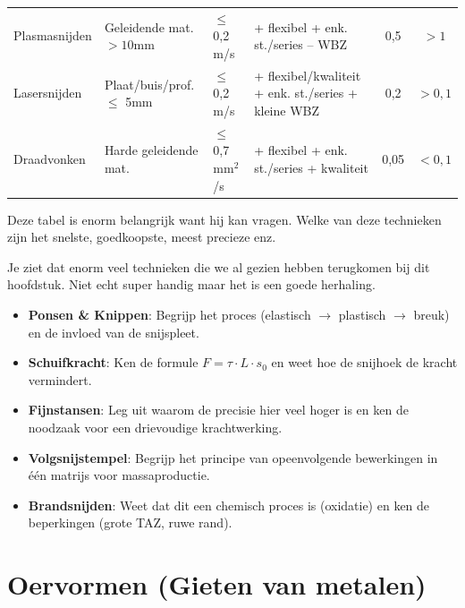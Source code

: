 \documentclass[a4paper,12pt,twoside]{report}
\begin{document}
\begin{table}[ht]
\begin{tabularx}{\textwidth}{@{} l >{\raggedright\arraybackslash}X l >{\raggedright\arraybackslash}X c c @{}}
        \addlinespace
        Plasmasnijden & Geleidende mat. $>10$mm & $\le$ 0,2 m/s & + flexibel \newline + enk. st./series \newline -- WBZ & 0,5 & $>1$ \\
        \addlinespace
        Lasersnijden & Plaat/buis/prof. $\le$ 5mm & $\le$ 0,2 m/s & + flexibel/kwaliteit \newline + enk. st./series \newline + kleine WBZ & 0,2 & $>0,1$ \\
        \addlinespace
        Draadvonken & Harde geleidende mat. & $\le$ 0,7 mm$^2$/s & + flexibel \newline + enk. st./series \newline + kwaliteit & 0,05 & $<0,1$ \\
        \bottomrule
    \end{tabularx}
\end{table}

Deze tabel is enorm belangrijk want hij kan vragen. Welke van deze technieken zijn het 
snelste, goedkoopste, meest precieze enz.

Je ziet dat enorm veel technieken die we al gezien hebben terugkomen bij dit hoofdstuk. 
Niet echt super handig maar het is een goede herhaling.

\begin{warningbox}[title=EXAMEN CHECKLIST: SCHEIDEN]
    \begin{itemize}
        \item \textbf{Ponsen \& Knippen}: Begrijp het proces (elastisch $\to$ plastisch $\to$ breuk) en de invloed van de snijspleet.
        \item \textbf{Schuifkracht}: Ken de formule $F = \tau \cdot L \cdot s_0$ en weet hoe de snijhoek de kracht vermindert.
        \item \textbf{Fijnstansen}: Leg uit waarom de precisie hier veel hoger is en ken de noodzaak voor een drievoudige krachtwerking.
        \item \textbf{Volgsnijstempel}: Begrijp het principe van opeenvolgende bewerkingen in één matrijs voor massaproductie.
        \item \textbf{Brandsnijden}: Weet dat dit een chemisch proces is (oxidatie) en ken de beperkingen (grote TAZ, ruwe rand).
    \end{itemize}
\end{warningbox}

\chapter{Oervormen (Gieten van metalen)}
\end{document}
